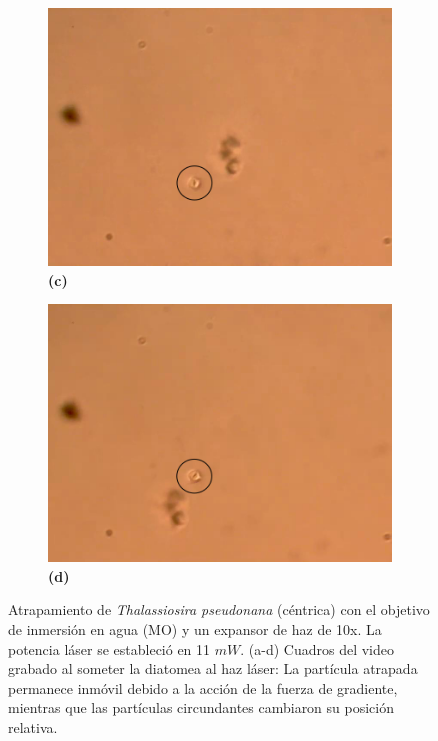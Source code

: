 \documentclass[10pt,aspectratio=1610,compress,dvipsnames]{beamer}
\begin{document}
\begin{frame}
{\begin{figure}
  \begin{subfigure}[b]{0.2\linewidth}
    \includegraphics[width=\linewidth]{Results/Pseudonana water/wpseudonana3.png} %
    \caption*{\textbf{(c)}}
    \label{fig7:c}
  \end{subfigure}\hspace{0.5cm} %
  \begin{subfigure}[b]{0.2\linewidth}
    \includegraphics[width=\linewidth]{Results/Pseudonana water/wpseudonana4.png} %
    \caption*{\textbf{(d)}}
    \label{fig7:d}
  \end{subfigure}
  \caption{
Atrapamiento de \textit{Thalassiosira pseudonana} (céntrica) con el objetivo de inmersión en agua (MO) y un expansor de haz de 10x. La potencia láser se estableció en 11 $mW$. (a-d) Cuadros del video grabado al someter la diatomea al haz láser: La partícula atrapada permanece inmóvil debido a la acción de la fuerza de gradiente, mientras que las partículas circundantes cambiaron su posición relativa. }
  \label{poresfrustrules}
\end{figure}

}
\end{frame}
\end{document}
